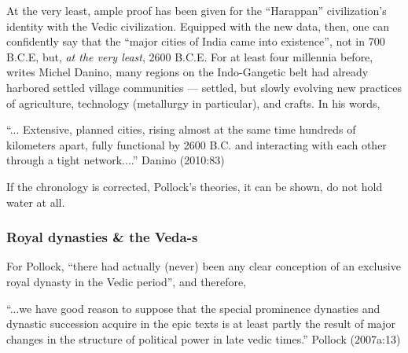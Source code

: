 At the very least, ample proof has been given for the “Harappan” civilization’s identity with the Vedic civilization. Equipped with the new data, then, one can confidently say that the “major cities of India came into existence”, not in 700 B.C.E, but, {\sl at the very least}, 2600 B.C.E. For at least four millennia before, writes Michel Danino, many regions on the Indo-Gangetic belt had already harbored settled village communities --- settled, but slowly evolving new practices of agriculture, technology (metallurgy in particular), and crafts. In his words, 

\begin{myquote}
“... Extensive, planned cities, rising almost at the same time hundreds of kilometers apart, fully functional by 2600 B.C. and interacting with each other through a tight network....” \hfill Danino (2010:83)
\end{myquote}

If the chronology is corrected, Pollock’s theories, it can be shown, do not hold water at all.

\subsubsection{Royal dynasties \& the Veda-s}\label{sec1.1.2.3}

For Pollock, “there had actually (never) been any clear conception of an exclusive royal dynasty in the Vedic period”, and therefore, 

\begin{myquote}
“...we have good reason to suppose that the special prominence dynasties and dynastic succession acquire in the epic texts is at least partly the result of major changes in the structure of political power in late vedic times.”
\hfill Pollock (2007a:13)
\end{myquote}

